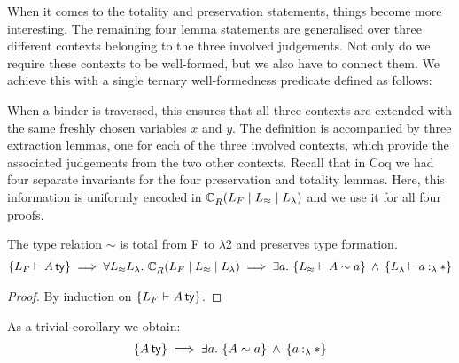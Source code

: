 \documentclass[a4paper,UKenglish]{lipics-v2016}
\newcommand{\ms}{\,}
\newcommand{\mrel}[1]{\mathrel{\ms #1 \ms}}
\newcommand{\mAnd}{\mrel{\wedge}}
\newcommand{\mAll}[1]{\ensuremath{\forall} #1.\ms\ms}
\newcommand{\mEx}[1]{\ensuremath{\exists} #1.\ms\ms}
\newcommand{\SysL}{$\lambda$2\xspace}
\newcommand{\istyFh}[1]{\ensuremath{#1\ms\mathsf{ty}}}
\newcommand{\typingFh}[2]{\ensuremath{#1 \mathbin{:_{F}} #2}}
\newcommand{\typingLh}[2]{\ensuremath{#1 \mathbin{:_{\lambda}} #2}}
\newcommand{\tyr}{\mathrel{\sim}}
\newcommand{\tmr}{\mathrel{\approx}}
\newcommand{\Prp}{\ensuremath{\textrm{\textasteriskcentered}}}
\newcommand{\emptyctx}{\ensuremath{\bullet}}
\theoremstyle{plain}
\begin{document}
When it comes to the totality and preservation statements, things become more interesting.
The remaining four lemma statements are generalised over three different contexts belonging to the three involved judgements.
Not only do we require these contexts to be well-formed, but we also have to connect them.
We achieve this with a single ternary well-formedness predicate defined as follows:
\newcommand{\acR}[3]{\ac{R}{~}{#1 \mid #2 \mid #3}}
When a binder is traversed, this ensures that all three contexts are extended with the same freshly chosen variables $x$ and $y$.
The definition is accompanied by three extraction lemmas, one for each of the three involved contexts, which provide the associated judgements from the two other contexts.
Recall that in Coq we had four separate invariants for the four preservation and totality lemmas.
Here, this information is uniformly encoded in $\acR{L_{F}}{L_{\tmr}}{L_{\lambda}}$ and we use it for all four proofs.
\begin{lemma} The type relation $\tyr$ is total from F to \SysL and preserves type formation.
  \begin{align*}
    \aj{L_{F}}{\istyFh{A}} \implies \mAll{L_{\tmr}L_{\lambda}} \acR{L_{F}}{L_{\tmr}}{L_{\lambda}} \implies \mEx{a} \aj{L_{\tmr}}{A \tyr a} \mAnd \aj{L_{\lambda}}{\typingLh{a}{\Prp}}
\end{align*}
\end{lemma}
\begin{proof}
  By induction on $\aj{L_{F}}{\istyFh{A}}$.
\end{proof}
As a trivial corollary we obtain:
\begin{align*}
  \aje{\istyFh{A}} \implies \mEx{a} \aje{A \tyr a} \mAnd \aje{\typingLh{a}{\Prp}}
\end{align*}
\end{document}
